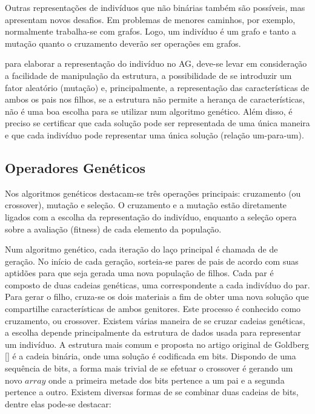 Outras representações de indivíduos que não binárias também são possíveis, mas apresentam novos desafios. Em problemas de menores caminhos, por exemplo, normalmente trabalha-se com grafos. Logo, um indivíduo é um grafo e tanto a mutação quanto o cruzamento deverão ser operações em grafos.

para elaborar a representação do indivíduo no AG, deve-se levar em consideração a facilidade de manipulação da estrutura, a possibilidade de se introduzir um fator aleatório (mutação) e, principalmente, a representação das características de ambos os pais nos filhos, se a estrutura não permite a herança de características, não é uma boa escolha para se utilizar num algoritmo genético. Além disso, é preciso se certificar que cada solução pode ser representada de uma única maneira e que cada indivíduo pode representar uma única solução (relação um-para-um).

\subsection{Operadores Genéticos}
Nos algoritmos genéticos destacam-se três operações principais: cruzamento (ou crossover), mutação e seleção. O cruzamento e a mutação estão diretamente ligados com a escolha da representação do indivíduo, enquanto a seleção opera sobre a avaliação (fitness) de cada elemento da população.

Num algoritmo genético, cada iteração do laço principal é chamada de de geração. No início de cada geração, sorteia-se pares de pais de acordo com suas aptidões para que seja gerada uma nova população de filhos. Cada par é composto de duas cadeias genéticas, uma correspondente a cada indivíduo do par. Para gerar o filho, cruza-se os dois materiais a fim de obter uma nova solução que compartilhe características de ambos genitores. Este processo é conhecido como cruzamento, ou crossover. Existem várias maneira de se cruzar cadeias genéticas, a escolha depende principalmente da estrutura de dados usada para representar um indivíduo. A estrutura mais comum e proposta no artigo original de Goldberg [] é a cadeia binária, onde uma solução é codificada em bits. Dispondo de uma sequência de bits, a forma mais trivial de se efetuar o crossover é gerando um novo $array$ onde a primeira metade dos bits pertence a um pai e a segunda pertence a outro. Existem diversas formas de se combinar duas cadeias de bits, dentre elas pode-se destacar:


